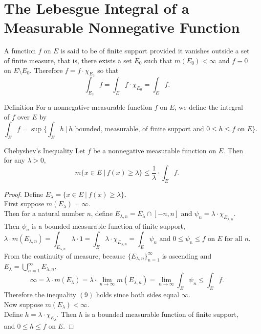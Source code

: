 \section{The Lebesgue Integral of a Measurable Nonnegative Function}
\begin{flushleft}
    A function $f$ on $E$ is said to be of finite support provided it vanishes outside a set of finite measure, that is, there exists a set $E_0$ such that $m(E_0)<\infty$ and $f\equiv0$ on $E\setminus E_0$.
    Therefore $f=f\cdot\chi_{E_0}$ so that 
    \[
        \int_{E_0}f=\int_Ef\cdot\chi_{E_0}=\int_Ef.
    \]
    \begin{namedthm*}{Definition}
        For a nonnegative measurable function $f$ on $E$, we define the integral of $f$ over $E$ by
        \[
            \int_Ef=\sup\biggl\{\int_Eh\ |\ h\text{ bounded, measurable, of finite support and }0\le h\le f\text{ on }E\biggr\}.
        \]
    \end{namedthm*}
    \begin{namedthm*}{Chebyshev's Inequality}
        Let $f$ be a nonnegative measurable function on $E$.
        Then for any $\lambda>0$, 
        \[
            m\{x\in E\ |\ f(x)\ge\lambda\}\le\frac{1}{\lambda}\cdot\int_Ef.\tag{9}
        \]
    \end{namedthm*}
    \begin{proof}
        Define $E_\lambda=\{x\in E\ |\ f(x)\ge\lambda\}$. 
        \\First suppose $m(E_\lambda)=\infty$.
        \\Then for a natural number $n$, define $E_{\lambda,n}=E_\lambda\cap[-n,n]$ and $\psi_n=\lambda\cdot\chi_{E_{\lambda,n}}$.
        Then $\psi_n$ is a bounded measurable function of finite support, 
        \[
            \lambda\cdot m(E_{\lambda,n})=\int_{E_{\lambda,n}}\lambda\cdot1=\int_E\lambda\cdot\chi_{E_{\lambda,n}}=\int_E\psi_n\text{ and }0\le\psi_n\le f\text{ on }E\text{ for all }n.
        \]
        From the continuity of measure, because $\{E_{\lambda,n}\}_{n=1}^\infty$ is ascending and $E_\lambda=\bigcup_{n=1}^\infty E_{\lambda,n}$,
        \[
            \infty=\lambda\cdot m(E_\lambda)=\lambda\cdot \lim_{n\to\infty}m(E_{\lambda,n})=\lim_{n\to\infty}\int_E\psi_n\le\int_Ef.
        \]
        Therefore the inequality $(9)$ holds since both sides equal $\infty$.
        \\Now suppose $m(E_\lambda)<\infty$.
        \\Define $h=\lambda\cdot\chi_{E_\lambda}$.
        Then $h$ is a bounded measurable function of finite support, and $0\le h\le f$ on $E$.

\end{proof}
\end{flushleft}
